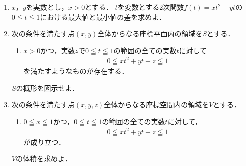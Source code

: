 \documentclass[../../main.tex]{subfiles}
\begin{document}
\begin{enumerate}
  \item $x$，$y$を実数とし，$x>0$とする．
    $t$を変数とする2次関数$f(t)=xt^2+yt$の$0 \leqq t \leqq 1$における最大値と最小値の差を求めよ．
  \item 次の条件を満たす点$(x,y)$全体からなる座標平面内の領域を$S$とする．
    \begin{enumerate}
      \item []$x>0$かつ，実数$z$で$0 \leqq t \leqq 1$の範囲の全ての実数$t$に対して
        \begin{align*}
          0 \leqq xt^2 + yt + z \leqq 1
        \end{align*}
        を満たすようなものが存在する．
    \end{enumerate}
    $S$の概形を図示せよ．
  \item 次の条件を満たす点$(x,y,z)$全体からなる座標空間内の領域を$V$とする．
    \begin{enumerate}
      \item []$0 \leqq x \leqq 1$かつ，$0 \leqq t \leqq 1$の範囲の全ての実数$t$に対して，
        \begin{align*}
          0 \leqq xt^2 + yt + z \leqq 1
        \end{align*}
        が成り立つ．
    \end{enumerate}
    $V$の体積を求めよ．
\end{enumerate}
\end{document}
